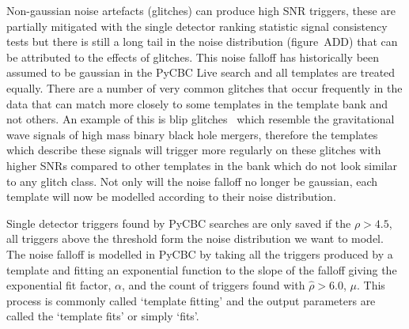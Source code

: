 Non-gaussian noise artefacts (glitches) can produce high SNR triggers, these are partially mitigated with the single detector ranking statistic signal consistency tests but there is still a long tail in the noise distribution (figure~ADD) that can be attributed to the effects of glitches.
%
%
This noise falloff has historically been assumed to be gaussian in the PyCBC Live search and all templates are treated equally. There are a number of very common glitches that occur frequently in the data that can match more closely to some templates in the template bank and not others. An example of this is blip glitches~\cite{blips:2019} which resemble the gravitational wave signals of high mass binary black hole mergers, therefore the templates which describe these signals will trigger more regularly on these glitches with higher SNRs compared to other templates in the bank which do not look similar to any glitch class. Not only will the noise falloff no longer be gaussian, each template will now be modelled according to their noise distribution.

Single detector triggers found by PyCBC searches are only saved if the $\rho > 4.5$, all triggers above the threshold form the noise distribution we want to model. The noise falloff is modelled in PyCBC by taking all the triggers produced by a template and fitting an exponential function to the slope of the falloff giving the exponential fit factor, $\alpha$, and the count of triggers found with $\hat{\rho} > 6.0$, $\mu$. This process is commonly called `template fitting' and the output parameters are called the `template fits' or simply `fits'.

